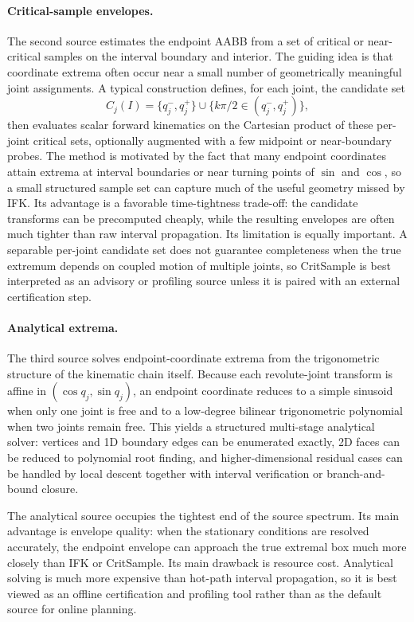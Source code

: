 \documentclass[journal]{IEEEtran}
\begin{document}
\paragraph{Critical-sample envelopes.}
The second source estimates the endpoint AABB from a set of critical or
near-critical samples on the interval boundary and interior. The guiding idea is
that coordinate extrema often occur near a small number of geometrically
meaningful joint assignments. A typical construction defines, for each joint,
the candidate set
\[
C_j(I) = \{q_j^-, q_j^+\} \cup \{k\pi/2 \in (q_j^-, q_j^+)\},
\]
then evaluates scalar forward kinematics on the Cartesian product of these
per-joint critical sets, optionally augmented with a few midpoint or
near-boundary probes. The method is motivated by the fact that many endpoint
coordinates attain extrema at interval boundaries or near turning points of
$\sin$ and $\cos$, so a small structured sample set can capture much of the
useful geometry missed by IFK. Its advantage is a favorable time-tightness
trade-off: the candidate transforms can be precomputed cheaply, while the
resulting envelopes are often much tighter than raw interval propagation. Its
limitation is equally important. A separable per-joint candidate set does not
guarantee completeness when the true extremum depends on coupled motion of
multiple joints, so CritSample is best interpreted as an advisory or profiling
source unless it is paired with an external certification step.

\paragraph{Analytical extrema.}
The third source solves endpoint-coordinate extrema from the trigonometric
structure of the kinematic chain itself. Because each revolute-joint transform
is affine in $(\cos q_j,\sin q_j)$, an endpoint coordinate reduces to a simple
sinusoid when only one joint is free and to a low-degree bilinear
trigonometric polynomial when two joints remain free. This yields a structured
multi-stage analytical solver: vertices and 1D boundary edges can be enumerated
exactly, 2D faces can be reduced to polynomial root finding, and
higher-dimensional residual cases can be handled by local descent together with
interval verification or branch-and-bound closure.

The analytical source occupies the tightest end of the source spectrum. Its
main advantage is envelope quality: when the stationary conditions are resolved
accurately, the endpoint envelope can approach the true extremal box much more
closely than IFK or CritSample. Its main drawback is resource cost. Analytical
solving is much more expensive than hot-path interval propagation, so
it is best viewed as an offline certification and profiling tool rather than as
the default source for online planning.
\end{document}
